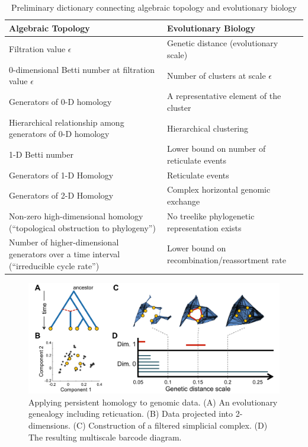 \begin{table}
\centering
\caption{Preliminary dictionary connecting algebraic topology and evolutionary biology}
\small
{}
\setlength{\aboverulesep}{0pt}
\setlength{\belowrulesep}{0pt}
\setlength{\extrarowheight}{.75ex}
\begin{tabularx}{\textwidth}{XX}
\toprule\rowcolor{gray!50}
Algebraic Topology                                         & Evolutionary Biology \\
\midrule
Filtration value $\epsilon$                                & Genetic distance (evolutionary scale) \\
0-dimensional Betti number at filtration value $\epsilon$  & Number of clusters at scale $\epsilon$ \\
Generators of 0-D homology                                 & A representative element of the cluster \\
Hierarchical relationship among generators of 0-D homology & Hierarchical clustering \\
1-D Betti number                                           & Lower bound on number of reticulate events \\
Generators of 1-D Homology                                 & Reticulate events \\
Generators of 2-D Homology                                 & Complex horizontal genomic exchange \\
Non-zero high-dimensional homology (“topological obstruction to phylogeny”) & No treelike phylogenetic representation exists \\
Number of higher-dimensional generators over a time interval (“irreducible cycle rate”) & Lower bound on recombination/reassortment rate \\
\bottomrule
\end{tabularx}
\label{table:dictionary}
\end{table}

\begin{figure}
\centering
\includegraphics[width=\textwidth]{./fig/tda_on_sequencedata.pdf}
\caption[Applying TDA to Sequence Data]{Applying persistent homology to genomic data. (A) An evolutionary genealogy including reticuation. (B) Data projected into 2-dimensions. (C) Construction of a filtered simplicial complex. (D) The resulting multiscale barcode diagram.}
\label{background:fig:tda_on_sequencedata}
\end{figure}


